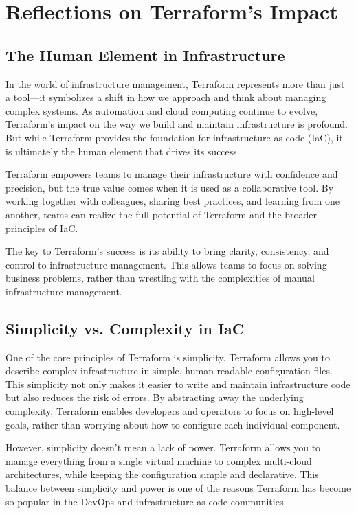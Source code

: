 \chapter{Reflections on Terraform's Impact}
\sloppy

\section{The Human Element in Infrastructure}

In the world of infrastructure management, Terraform represents more than just a tool—it symbolizes a shift in how we approach and think about managing complex systems. As automation and cloud computing continue to evolve, Terraform's impact on the way we build and maintain infrastructure is profound. But while Terraform provides the foundation for infrastructure as code (IaC), it is ultimately the human element that drives its success.

Terraform empowers teams to manage their infrastructure with confidence and precision, but the true value comes when it is used as a collaborative tool. By working together with colleagues, sharing best practices, and learning from one another, teams can realize the full potential of Terraform and the broader principles of IaC.

The key to Terraform's success is its ability to bring clarity, consistency, and control to infrastructure management. This allows teams to focus on solving business problems, rather than wrestling with the complexities of manual infrastructure management.

\section{Simplicity vs. Complexity in IaC}

One of the core principles of Terraform is simplicity. Terraform allows you to describe complex infrastructure in simple, human-readable configuration files. This simplicity not only makes it easier to write and maintain infrastructure code but also reduces the risk of errors. By abstracting away the underlying complexity, Terraform enables developers and operators to focus on high-level goals, rather than worrying about how to configure each individual component.

However, simplicity doesn't mean a lack of power. Terraform allows you to manage everything from a single virtual machine to complex multi-cloud architectures, while keeping the configuration simple and declarative. This balance between simplicity and power is one of the reasons Terraform has become so popular in the DevOps and infrastructure as code communities.

